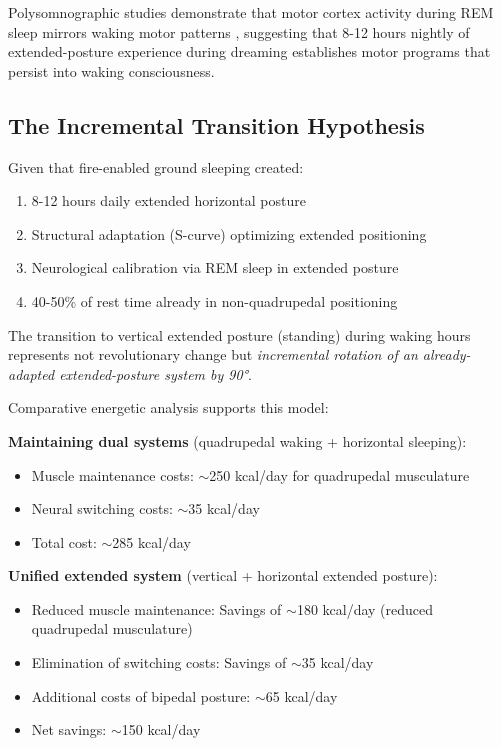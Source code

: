 Polysomnographic studies demonstrate that motor cortex activity during REM sleep mirrors waking motor patterns \citep{hobson2009rem}, suggesting that 8-12 hours nightly of extended-posture experience during dreaming establishes motor programs that persist into waking consciousness.

\subsection{The Incremental Transition Hypothesis}

Given that fire-enabled ground sleeping created:
\begin{enumerate}
\item 8-12 hours daily extended horizontal posture
\item Structural adaptation (S-curve) optimizing extended positioning
\item Neurological calibration via REM sleep in extended posture
\item 40-50\% of rest time already in non-quadrupedal positioning
\end{enumerate}

The transition to vertical extended posture (standing) during waking hours represents not revolutionary change but \textit{incremental rotation of an already-adapted extended-posture system by 90°}.

Comparative energetic analysis supports this model:

\textbf{Maintaining dual systems} (quadrupedal waking + horizontal sleeping):
\begin{itemize}
\item Muscle maintenance costs: $\sim$250 kcal/day for quadrupedal musculature
\item Neural switching costs: $\sim$35 kcal/day
\item Total cost: $\sim$285 kcal/day
\end{itemize}

\textbf{Unified extended system} (vertical + horizontal extended posture):
\begin{itemize}
\item Reduced muscle maintenance: Savings of $\sim$180 kcal/day (reduced quadrupedal musculature)
\item Elimination of switching costs: Savings of $\sim$35 kcal/day
\item Additional costs of bipedal posture: $\sim$65 kcal/day
\item Net savings: $\sim$150 kcal/day
\end{itemize}

